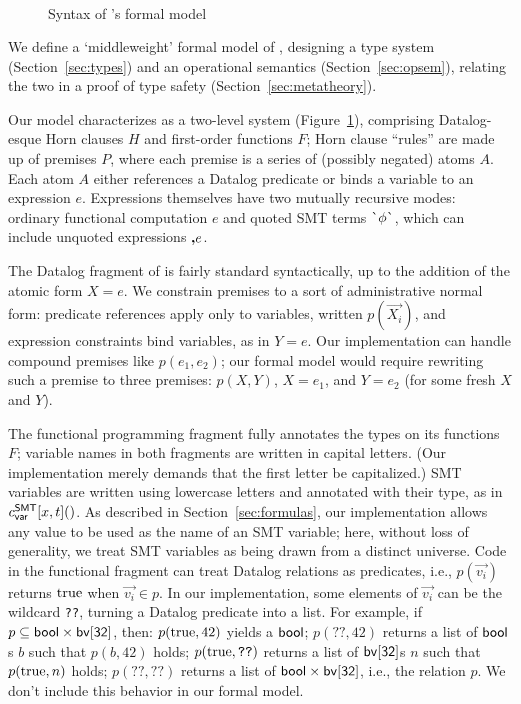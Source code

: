 \documentclass[acmsmall,screen,nonacm]{acmart}
\theoremstyle{definition}
\begin{document}
\begin{figure}[t]
\[\begin{array}{lrcl}
  \end{array} \]

  \caption{Syntax of \Name's formal model}
  \label{fig:syntax}
\end{figure}

We define a `middleweight' formal model of \Name, designing a type
system (Section~\ref{sec:types}) and an operational semantics
(Section~\ref{sec:opsem}), relating the two in a proof of type safety
(Section~\ref{sec:metatheory}).

Our model characterizes \Name as a two-level system
(Figure~\ref{fig:syntax}), comprising Datalog-esque Horn clauses $H$
and first-order functions $F$; Horn clause ``rules'' are made up of
premises $P$, where each premise is a series of (possibly negated)
atoms $A$. Each atom $A$ either references a Datalog predicate or
binds a variable to an expression $e$. Expressions themselves have two
mutually recursive modes: ordinary functional computation $e$ and
quoted SMT terms $\textsf{\`{}}{\phi}\textsf{\`{}}$, which can include unquoted expressions
$\textbf{,}{e}$.

The Datalog fragment of \Name is fairly standard syntactically, up to
the addition of the atomic form $X = e$.
%
We constrain premises to a sort of administrative normal form:
predicate references apply only to variables, written $p(\vec{X_i})$, and
expression constraints bind variables, as in $Y = e$.
%
Our implementation can handle compound premises like $p(e_1, e_2)$;
our formal model would require rewriting such a premise to three
premises: $p(X, Y)$, $X = e_1$, and $Y = e_2$ (for some fresh $X$ and
$Y$).

The functional programming fragment fully annotates the types on its
functions $F$; variable names in both fragments are written in capital
letters. (Our implementation merely demands that the first letter be
capitalized.)
%
SMT variables are written using lowercase letters and annotated with their
type, as in $c^\mathsf{SMT}_{\mathsf{var}}[x, t]()$.
As described in Section~\ref{sec:formulas}, our implementation allows any value
to be used as the name of an SMT variable; here, without loss of generality, we
treat SMT variables as being drawn from a distinct universe.
Code in the functional fragment can treat Datalog relations as
predicates, i.e., $p(\vec{v_i})$ returns $\mathrm{true}$ when $\vec{v_i} \in
p$.
%
In our implementation, some elements of $\vec{v_i}$ can be the
wildcard \texttt{??}, turning a Datalog predicate into a list.
%
For example, if $p \subseteq \mathsf{bool} \times \mathsf{bv[32]}$, then: $p(\mathrm{true},
42)$ yields a $\mathsf{bool}$; $p(\texttt{??}, 42)$ returns a list of $\mathsf{bool}$s
$b$ such that $p(b, 42)$ holds; $p(\mathrm{true}, \texttt{??})$ returns a list
of $\mathsf{bv[32]}$s $n$ such that $p(\mathrm{true}, n)$ holds;
$p(\texttt{??}, \texttt{??})$ returns a list of
$\mathsf{bool} \times \mathsf{bv[32]}$, i.e., the relation $p$. We don't include this
behavior in our formal model.
\end{document}
